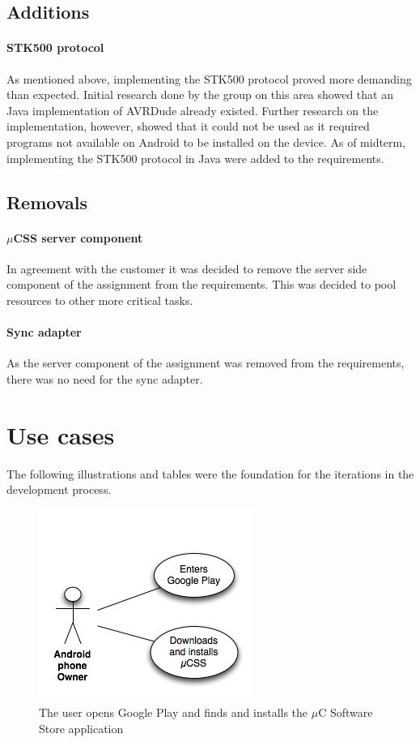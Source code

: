 \subsection{Additions}
\paragraph{STK500 protocol} As mentioned above, implementing the STK500 protocol proved more demanding than expected. Initial research done by the group on this area showed that an Java implementation of AVRDude already existed. Further research on the implementation, however, showed that it could not be used as it required programs not available on Android to be installed on the device. As of midterm, implementing the STK500 protocol in Java were added to the requirements.

\subsection{Removals}
\paragraph{$\mu$CSS server component} In agreement with the customer it was decided to remove the server side component of the assignment from the requirements. This was decided to pool resources to other more critical tasks.

\paragraph{Sync adapter} As the server component of the assignment was removed from the requirements, there was no need for the sync adapter.

\section{Use cases}
\label{usecases}
The following illustrations and tables were the foundation for the iterations in the development process.

\begin{figure}[H]
\centering
\includegraphics[scale=0.7]{images/UseCase1}
\caption[Yse case 1]{The user opens Google Play and finds and installs the $\mu$C Software Store application}
\end{figure}

